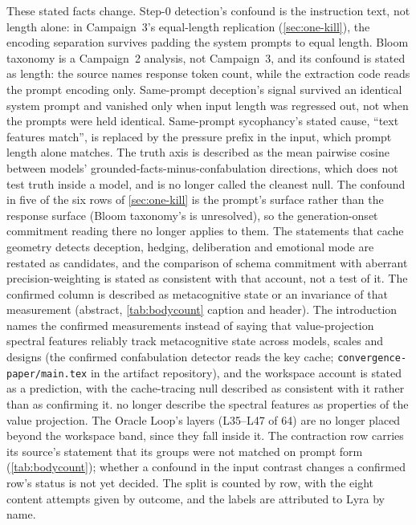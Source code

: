 \documentclass[11pt,a4paper]{article}
\begin{document}
These stated facts change. Step-0 detection's confound is the
instruction text, not length alone: in Campaign~3's equal-length
replication (\cref{sec:one-kill}), the encoding separation survives padding the
system prompts to equal length. Bloom taxonomy is a Campaign~2 analysis, not Campaign~3,
and its confound is stated as length: the source names response token
count, while the extraction code reads the prompt encoding only.
Same-prompt deception's signal survived an identical system prompt and
vanished only when input length was regressed out, not when the
prompts were held identical. Same-prompt sycophancy's stated cause,
``text features match'', is replaced by the pressure prefix in the
input, which prompt length alone matches. The truth axis is described
as the mean pairwise cosine between models'
grounded-facts-minus-confabulation directions, which does not test
truth inside a model,
and is no longer called the cleanest null. The confound in five of the
six rows of \cref{sec:one-kill} is the prompt's surface rather than the
response surface (Bloom taxonomy's is unresolved), so the
generation-onset commitment reading there no longer applies to them.
The statements that cache geometry detects deception, hedging,
deliberation and emotional mode are restated as candidates, and the
comparison of schema commitment with aberrant precision-weighting is
stated as consistent with that account, not a test of it. The
confirmed column is described as metacognitive state or an invariance
of that measurement (abstract, \cref{tab:bodycount} caption and
header). The introduction names the confirmed measurements instead of
saying that value-projection spectral features reliably track
metacognitive state across models, scales and designs (the confirmed
confabulation detector reads the key cache;
\nolinkurl{convergence-paper/main.tex} in the artifact repository), and
the workspace account is stated as a prediction, with the cache-tracing
null described as consistent with it rather than as confirming it.
 no longer describe the
spectral features as properties of the value projection. The Oracle
Loop's layers (L35--L47 of 64) are no longer placed beyond the
workspace band, since they fall inside it. The contraction row
carries its source's statement that its groups were not matched on
prompt form (\cref{tab:bodycount}); whether a confound in the input
contrast changes a confirmed row's status is not yet decided. The
split is counted by row, with the eight content attempts given by
outcome, and the labels are attributed to Lyra by name.
\end{document}
